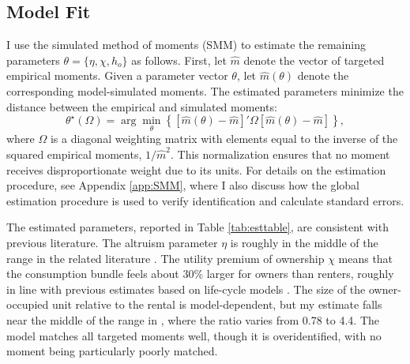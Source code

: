 \documentclass[12pt]{article}
\begin{document}
\subsection{Model Fit}
I use the simulated method of moments (SMM) to estimate the remaining parameters $\theta=\{\eta,\chi,h_o\}$ as follows. First, let $\hat m$ denote the vector of targeted empirical moments. Given a parameter vector $\theta$, let $\hat m(\theta)$ denote the corresponding model-simulated moments. The estimated parameters minimize the distance between the empirical and simulated moments:
 \begin{equation}
\label{eq:SMM}
 \theta^\star(\Omega) = \arg\min_\theta \left\{[\hat m(\theta) - \hat m]'\Omega [\hat m(\theta) - \hat m]\right\},
\end{equation}
where $\Omega$ is a diagonal weighting matrix with elements equal to the inverse of the squared empirical moments, $1/\hat m^2$. This normalization ensures that no moment receives disproportionate weight due to its units. For details on the estimation procedure, see Appendix \ref{app:SMM}, where I also discuss how the global estimation procedure is used to verify identification and calculate standard errors.

The estimated parameters, reported in Table \ref{tab:esttable}, are consistent with previous literature. The altruism parameter $\eta$ is roughly in the middle of the range in the related literature \cite[see e.g.,][]{Boar2018,Barczyk2020a,Mommaerts2016,Lee2019}. The utility premium of ownership $\chi$ means that the consumption bundle feels about 30\% larger for owners than renters, roughly in line with previous estimates based on life-cycle models \cite[see e.g.,][]{McGee2019,Fisher2011}. The size of the owner-occupied unit relative to the rental is model-dependent, but my estimate falls near the middle of the range in \cite{Kaplan2020}, where the ratio varies from 0.78 to 4.4. The model matches all targeted moments well, though it is overidentified, with no moment being particularly poorly matched. 



% 
\end{document}
